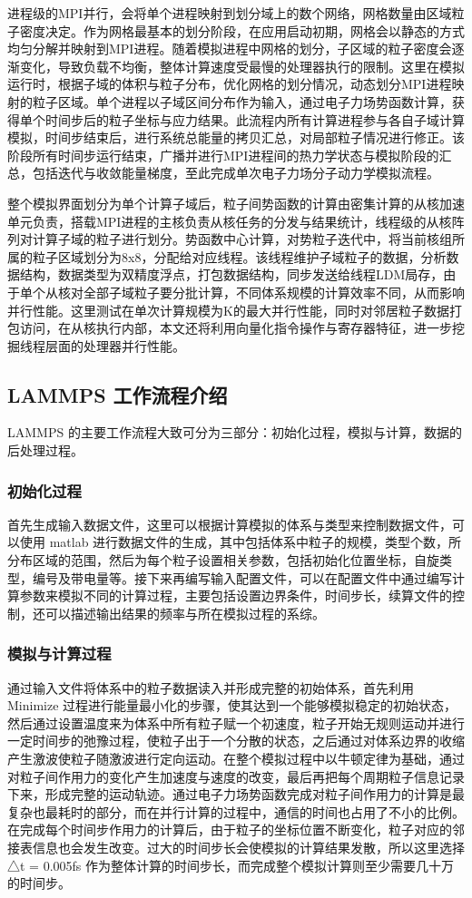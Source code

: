 进程级的MPI并行，会将单个进程映射到划分域上的数个网络，网格数量由区域粒子密度决定。作为网格最基本的划分阶段，在应用启动初期，网格会以静态的方式均匀分解并映射到MPI进程。随着模拟进程中网格的划分，子区域的粒子密度会逐渐变化，导致负载不均衡，整体计算速度受最慢的处理器执行的限制。这里在模拟运行时，根据子域的体积与粒子分布，优化网格的划分情况，动态划分MPI进程映射的粒子区域。单个进程以子域区间分布作为输入，通过电子力场势函数计算，获得单个时间步后的粒子坐标与应力结果。此流程内所有计算进程参与各自子域计算模拟，时间步结束后，进行系统总能量的拷贝汇总，对局部粒子情况进行修正。该阶段所有时间步运行结束，广播并进行MPI进程间的热力学状态与模拟阶段的汇总，包括迭代与收敛能量梯度，至此完成单次电子力场分子动力学模拟流程。

整个模拟界面划分为单个计算子域后，粒子间势函数的计算由密集计算的从核加速单元负责，搭载MPI进程的主核负责从核任务的分发与结果统计，线程级的从核阵列对计算子域的粒子进行划分。势函数中心计算，对势粒子迭代中，将当前核组所属的粒子区域划分为8x8，分配给对应线程。该线程维护子域粒子的数据，分析数据结构，数据类型为双精度浮点，打包数据结构，同步发送给线程LDM局存，由于单个从核对全部子域粒子要分批计算，不同体系规模的计算效率不同，从而影响并行性能。这里测试在单次计算规模为K的最大并行性能，同时对邻居粒子数据打包访问，在从核执行内部，本文还将利用向量化指令操作与寄存器特征，进一步挖掘线程层面的处理器并行性能。

\subsection{LAMMPS 工作流程介绍}
LAMMPS 的主要工作流程大致可分为三部分：初始化过程，模拟与计算，数据的后处理过程。

\subsubsection{初始化过程}
首先生成输入数据文件，这里可以根据计算模拟的体系与类型来控制数据文件，可以使用 matlab 进行数据文件的生成，其中包括体系中粒子的规模，类型个数，所分布区域的范围，然后为每个粒子设置相关参数，包括初始化位置坐标，自旋类型，编号及带电量等。接下来再编写输入配置文件，可以在配置文件中通过编写计算参数来模拟不同的计算过程，主要包括设置边界条件，时间步长，续算文件的控制，还可以描述输出结果的频率与所在模拟过程的系综。

\subsubsection{模拟与计算过程}
通过输入文件将体系中的粒子数据读入并形成完整的初始体系，首先利用Minimize 过程进行能量最小化的步骤，使其达到一个能够模拟稳定的初始状态，然后通过设置温度来为体系中所有粒子赋一个初速度，粒子开始无规则运动并进行一定时间步的弛豫过程，使粒子出于一个分散的状态，之后通过对体系边界的收缩产生激波使粒子随激波进行定向运动。在整个模拟过程中以牛顿定律为基础，通过对粒子间作用力的变化产生加速度与速度的改变，最后再把每个周期粒子信息记录下来，形成完整的运动轨迹。通过电子力场势函数完成对粒子间作用力的计算是最复杂也最耗时的部分，而在并行计算的过程中，通信的时间也占用了不小的比例。在完成每个时间步作用力的计算后，由于粒子的坐标位置不断变化，粒子对应的邻接表信息也会发生改变。过大的时间步长会使模拟的计算结果发散，所以这里选择△t = 0.005fs 作为整体计算的时间步长，而完成整个模拟计算则至少需要几十万的时间步。

